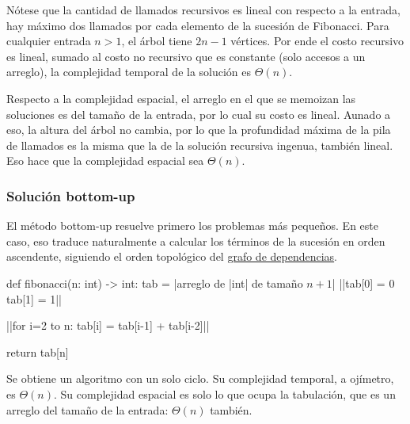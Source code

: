 Nótese que la cantidad de llamados recursivos es lineal con respecto a la entrada, hay máximo dos llamados por cada elemento de la sucesión de Fibonacci. Para cualquier entrada \(n > 1\), el árbol tiene \(2n - 1\) vértices. Por ende el costo recursivo es lineal, sumado al costo no recursivo que es constante (solo accesos a un arreglo), la complejidad temporal de la solución es \(\Theta(n)\).

Respecto a la complejidad espacial, el arreglo en el que se memoizan las soluciones es del tamaño de la entrada, por lo cual su costo es lineal. Aunado a eso, la altura del árbol no cambia, por lo que la profundidad máxima de la pila de llamados es la misma que la de la solución recursiva ingenua, también lineal. Eso hace que la complejidad espacial sea \(\Theta(n)\).

\subsubsection{Solución bottom-up}
\label{sec:fibonacci_bottom_up}

El método bottom-up resuelve primero los problemas más pequeños. En este caso, eso traduce naturalmente a calcular los términos de la sucesión en orden ascendente, siguiendo el orden topológico del \hyperref[fig:fibonacci_grafo_dependencias]{grafo de dependencias}.

\begin{codeblock}
\begin{pseudocode}
def fibonacci(n: int) -> int:
    tab = |\textrm{arreglo de }|int|\textrm{ de tamaño }$n+1$|
    ||tab[0] = 0
    tab[1] = 1||

    ||for i=2 to n:
        tab[i] = tab[i-1] + tab[i-2]||

    return tab[n]
\end{pseudocode}
\begin{annotations}
\end{annotations}
\end{codeblock}

Se obtiene un algoritmo con un solo ciclo. Su complejidad temporal, a ojímetro, es $\Theta(n)$. Su complejidad espacial es solo lo que ocupa la tabulación, que es un arreglo del tamaño de la entrada: $\Theta(n)$ también.

